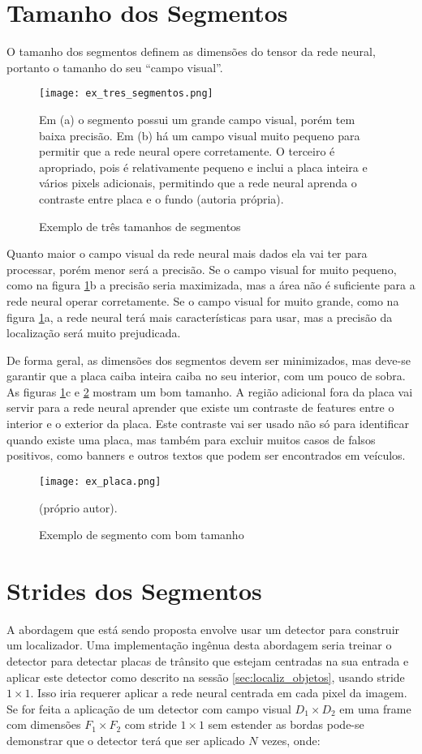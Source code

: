 \section{Tamanho dos Segmentos}
O tamanho dos segmentos definem as dimensões do tensor da rede neural, portanto
o tamanho do seu “campo visual”.

\begin{figure}[!htb]
	\centering
	\texttt{[image: ex\_tres\_segmentos.png]}
	\caption{Exemplo de três tamanhos de segmentos}
	\label{fig:ex_tres_segmentos}
	Em (a) o segmento possui um grande campo visual, porém tem baixa precisão.
	Em (b) há um campo visual muito pequeno para permitir que a rede neural
	opere corretamente. O terceiro é apropriado, pois é relativamente pequeno e
	inclui a placa inteira e vários pixels adicionais, permitindo que a rede
	neural aprenda o contraste entre placa e o fundo (autoria própria).
\end{figure}

Quanto maior o campo visual da rede neural mais dados ela vai ter para
processar, porém menor será a precisão. Se o campo visual for muito pequeno,
como na figura \ref{fig:ex_tres_segmentos}b a precisão seria maximizada,
mas a área não é suficiente para a rede neural operar corretamente. Se
o campo visual for muito grande, como na figura \ref{fig:ex_tres_segmentos}a,
a rede neural terá mais características para usar, mas a precisão da
localização será muito prejudicada.

De forma geral, as dimensões dos segmentos devem ser minimizados, mas deve-se
garantir que a placa caiba inteira caiba no seu interior, com um pouco de
sobra. As figuras \ref{fig:ex_tres_segmentos}c e \ref{fig:ex_placa} mostram
um bom tamanho. A região adicional fora da placa vai servir para a rede
neural aprender que existe um contraste de features entre o
interior e o exterior da placa. Este contraste vai ser usado não só para
identificar quando existe uma placa, mas também para excluir muitos casos de
falsos positivos, como banners e outros textos que podem ser encontrados em
veículos.

\begin{figure}[!htb]
	\centering
	\texttt{[image: ex\_placa.png]}
	\caption{Exemplo de segmento com bom tamanho}
	\label{fig:ex_placa}
	(próprio autor).
\end{figure}

\section{Strides dos Segmentos}
A abordagem que está sendo proposta envolve usar um detector para construir um
localizador. Uma implementação ingênua desta abordagem seria treinar o detector
para detectar placas de trânsito que estejam centradas na sua entrada e aplicar
este detector como descrito na sessão \ref{sec:localiz_objetos}, usando
stride $1 \times 1$.  Isso iria requerer aplicar a rede neural centrada em
cada pixel da imagem. Se for feita a aplicação de um detector com campo
visual $D_1 \times D_2$ em uma frame com dimensões $F_1 \times F_2$ com stride
$1 \times 1$ sem estender as bordas pode-se demonstrar que o detector terá
que ser aplicado $N$ vezes, onde:

